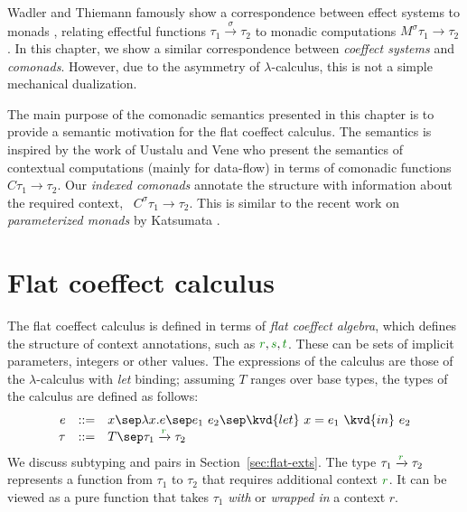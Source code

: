 Wadler and Thiemann famously show a correspondence between effect systems to monads 
\cite{monads-effects-marriage}, relating effectful functions $\tau_1 \xrightarrow{\sigma} \tau_2$ 
to monadic computations $M^\sigma \tau_1 \rightarrow \tau_2$. In this chapter, we show a similar
correspondence between \emph{coeffect systems} and \emph{comonads}. However, due to the asymmetry 
of $\lambda$-calculus, this is not a simple mechanical dualization.

The main purpose of the comonadic semantics presented in this chapter is to provide a semantic
motivation for the flat coeffect calculus. The semantics is inspired by the work of Uustalu and
Vene \cite{comonads-notions} who present the semantics of contextual computations (mainly for
data-flow) in terms of comonadic functions $C \tau_1 \rightarrow \tau_2$. Our \emph{indexed 
comonads} annotate the structure with information about the required context, \ie~$C^\sigma \tau_1 \rightarrow \tau_2$.
This is similar to the recent work on \emph{parameterized monads} by Katsumata \cite{monads-parametric}.


\section{Flat coeffect calculus}
\label{sec:flat-calculus}

The flat coeffect calculus is defined in terms of \emph{flat coeffect algebra}, which defines
the structure of context annotations, such as $\cclrd{r}, \cclrd{s}, \cclrd{t}$. These can be
sets of implicit parameters, integers or other values. The expressions of the calculus are those
of the $\lambda$-calculus with \emph{let} binding; assuming $T$ ranges over base types, the 
types of the calculus are defined as follows:
%
\begin{equation*}
\begin{array}{rcl}
e &::=& x \sep \lambda x.e \sep e_1~e_2 \sep \kvd{let}~x = e_1~\kvd{in}~e_2\\
\tau &::=& T \sep \tau_1 \xrightarrow{\cclrd{r}} \tau_2
\end{array}
\end{equation*}
%
We discuss subtyping and pairs in Section~\ref{sec:flat-exts}. The type $\tau_1 \xrightarrow{\cclrd{r}} \tau_2$
represents a function from $\tau_1$ to $\tau_2$ that requires additional context $\cclrd{r}$.
It can be viewed as a pure function that takes $\tau_1$ \emph{with} or \emph{wrapped in} a 
context $r$. 

